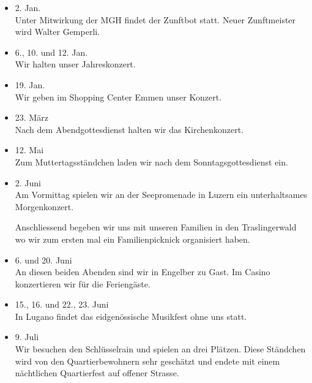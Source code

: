 \begin{history}


    \begin{itemize}

        \item[]2. Jan.\\
        Unter Mitwirkung der MGH findet der Zunftbot statt. Neuer Zunftmeister
        wird Walter Gemperli.

        \item[]6., 10. und 12. Jan.\\
        Wir halten unser Jahreskonzert.

        \item[]19. Jan.\\
        Wir geben im Shopping Center Emmen unser Konzert.

        \item[]23. März\\
        Nach dem Abendgottesdienst halten wir das Kirchenkonzert.

        \item[]12. Mai\\
        Zum Muttertagsständchen laden wir nach dem Sonntagsgottesdienst ein.

        \item[]2. Juni\\
        Am Vormittag spielen wir an der Seepromenade in Luzern ein
        unterhaltsames Morgenkonzert.

        Anschliessend begeben wir uns mit unseren Familien in den Traslingerwald
        wo wir zum ersten mal ein Familienpicknick organisiert haben.

        \item[]6. und 20. Juni\\
        An diesen beiden Abenden sind wir in Engelber zu Gast. Im Casino
        konzertieren wir für die Feriengäste.

        \item[]15., 16. und 22., 23. Juni\\
        In Lugano findet das eidgenössische Musikfest ohne uns statt.

        \item[]9. Juli\\
        Wir besuchen den Schlüsselrain und spielen an drei Plätzen. Diese
        Ständchen wird von den Quartierbewohnern sehr geschätzt und endete mit
        einem nächtlichen Quartierfest auf offener Strasse.


\end{itemize}
\end{history}
